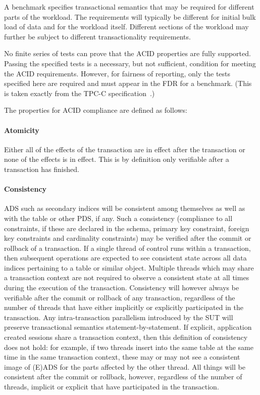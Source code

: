 A benchmark specifies transactional semantics that may be required for different parts of the workload. The requirements will typically be different for initial bulk load of data and for the workload itself. Different sections of the workload may further be subject to different transactionality requirements.

No finite series of tests can prove that the ACID properties are fully supported. Passing the specified tests is a necessary, but not sufficient, condition for meeting the ACID requirements. However, for fairness of reporting, only the tests specified here are required and must appear in the FDR for a benchmark. (This is taken exactly from the \mbox{TPC-C} specification~\cite{tpcc}.)

The properties for ACID compliance are defined as follows:

\paragraph{Atomicity}
Either all of the effects of the transaction are in effect after the transaction or none of the effects
is in effect. This is by definition only verifiable after a transaction has finished.

\paragraph{Consistency}
ADS such as secondary indices will be consistent among themselves as well as with the table or other PDS, if any. Such a consistency (compliance to all constraints, if these are declared in the schema, \eg primary key constraint, foreign key constraints and cardinality constraints) may be verified
after the commit or rollback of a transaction. If a single thread of control runs within a transaction, then
subsequent operations are expected to see consistent state across all data indices pertaining to a table
or similar object. Multiple threads which may share a transaction context are not required to observe a
consistent state at all times during the execution of the transaction. Consistency will however always be
verifiable after the commit or rollback of any transaction, regardless of the number of threads that have
either implicitly or explicitly participated in the transaction. Any intra-transaction parallelism introduced
by the SUT will preserve transactional semantics statement-by-statement. If explicit, application created
sessions share a transaction context, then this definition of consistency does not hold: for example, if
two threads insert into the same table at the same time in the same transaction context, these may or may
not see a consistent image of (E)ADS for the parts affected by the other thread. All things will be
consistent after the commit or rollback, however, regardless of the number of threads, implicit or explicit
that have participated in the transaction.

